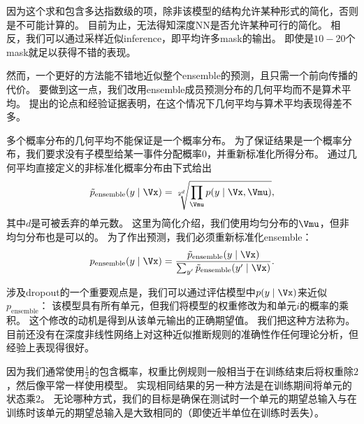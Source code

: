 
因为这个求和包含多达指数级的项，除非该模型的结构允许某种形式的简化，否则是不可能计算的。
目前为止，无法得知深度\gls{NN}是否允许某种可行的简化。
相反，我们可以通过采样近似\gls{inference}，即平均许多\gls{mask}的输出。
即使是$10-20$个\gls{mask}就足以获得不错的表现。

然而，一个更好的方法能不错地近似整个\gls{ensemble}的预测，且只需一个前向传播的代价。
要做到这一点，我们改用\gls{ensemble}成员预测分布的几何平均而不是算术平均。
\cite{WardeFarley-et-al-2014}提出的论点和经验证据表明，在这个情况下几何平均与算术平均表现得差不多。

多个概率分布的几何平均不能保证是一个概率分布。
为了保证结果是一个概率分布，我们要求没有子模型给某一事件分配概率0，并重新标准化所得分布。
通过几何平均直接定义的非标准化概率分布由下式给出
\begin{align}
\tilde{p}_{\text{ensemble}}(y \mid \Vx) = \sqrt[2^d]{\prod_{\Vmu} p(y \mid \Vx, \Vmu)},
\end{align}
其中$d$是可被丢弃的单元数。
这里为简化介绍，我们使用均匀分布的$\Vmu$，但非均匀分布也是可以的。
为了作出预测，我们必须重新标准化\gls{ensemble}：
\begin{align}
p_{\text{ensemble}}(y \mid \Vx)  = \frac{\tilde{p}_{\text{ensemble}}(y \mid \Vx)}
 {\sum_{y'}\tilde{p}_{\text{ensemble}}(y' \mid \Vx) }.
\end{align}
 
涉及\gls{dropout}的一个重要观点\citep{Hinton-et-al-2012c}是，我们可以通过评估模型中$p(y \mid \Vx)$来近似$ p_{\text{ensemble}}$：
该模型具有所有单元，但我们将模型的权重修改为和单元$i$的概率的乘积。
这个修改的动机是得到从该单元输出的正确期望值。
我们把这种方法称为。
目前还没有在深度非线性网络上对这种近似推断规则的准确性作任何理论分析，但经验上表现得很好。

 
因为我们通常使用$\frac{1}{2}$的包含概率，权重比例规则一般相当于在训练结束后将权重除$2$，然后像平常一样使用模型。
实现相同结果的另一种方法是在训练期间将单元的状态乘$2$。
无论哪种方式，我们的目标是确保在测试时一个单元的期望总输入与在训练时该单元的期望总输入是大致相同的（即使近半单位在训练时丢失）。

